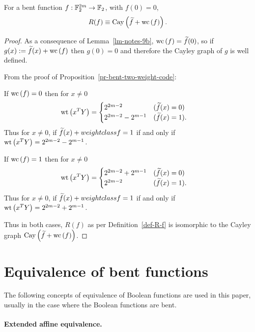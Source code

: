 \begin{Theorem}
For a bent function $f : \mathbb{F}_2^{2m} \rightarrow \mathbb{F}_2$, with $f(0)=0$,
\begin{align*}
R(f) \equiv \operatorname{Cay}\left(\widetilde{f} + \operatorname{wc}\left(f\right)\right).
\end{align*}

\end{Theorem}
\begin{proof}
As a consequence of Lemma~\ref{lm-notes-9b}, $\operatorname{wc}\left(f\right) = \widetilde{f}(0)$,
so if $g(x) := \widetilde{f}(x) + \operatorname{wc}\left(f\right)$ then $g(0)=0$ and therefore the Cayley graph of $g$
is well defined.

From the proof of Proposition~\ref{pr-bent-two-weight-code}:

If $\operatorname{wc}\left(f\right) = 0$ then for $x \neq 0$
\begin{align*}
\operatorname{wt}\left(x^T Y\right)
&=
\begin{cases}
2^{2m-2}           & (\widetilde{f}(x)=0)
\\
2^{2m-2} - 2^{m-1} & (\widetilde{f}(x)=1).
\end{cases}
\end{align*}
Thus for $x \neq 0$, if $\widetilde{f}(x) + weightclass{f} = 1$ if and only if $\operatorname{wt}\left(x^T Y\right) = 2^{2m-2} - 2^{m-1}$.

If $\operatorname{wc}\left(f\right) = 1$ then for $x \neq 0$
\begin{align*}
\operatorname{wt}\left(x^T Y\right)
&=
\begin{cases}
2^{2m-2} + 2^{m-1} & (\widetilde{f}(x)=0)
\\
2^{2m-2}           & (\widetilde{f}(x)=1).
\end{cases}
\end{align*}
Thus for $x \neq 0$, if $\widetilde{f}(x) + weightclass{f} = 1$ if and only if $\operatorname{wt}\left(x^T Y\right) = 2^{2m-2} + 2^{m-1}$.

Thus in both cases, $R(f)$ as per Definition~\ref{def-R-f} is isomorphic to the Cayley graph $\operatorname{Cay}\left(\widetilde{f} + \operatorname{wc}\left(f\right)\right)$.
\end{proof}

\section{Equivalence of bent functions}
\label{sec-Equivalence}
The following concepts of equivalence of Boolean functions are used in this paper,
usually in the case where the Boolean functions are bent.

\paragraph*{Extended affine equivalence.}

